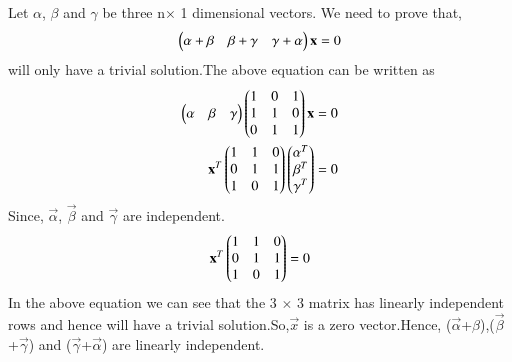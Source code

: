    Let $\alpha$, $\beta$ and $\gamma$ be three n$\times$ 1 dimensional vectors. We need to prove that,
   \begin{align}
   \begin{pmatrix}\alpha+\beta&\beta+\gamma&\gamma+\alpha\end{pmatrix}\mathbf{x}=0
  \end{align}
     will only have a trivial solution.The above equation can be written as
  \begin{align}
  \begin{pmatrix}\alpha&\beta&\gamma\end{pmatrix} \begin{pmatrix}1&0&1\\1&1&0\\0&1&1\end{pmatrix}\mathbf{x}=0\\
   \mathbf{x}^T\begin{pmatrix}1&1&0\\0&1&1\\1&0&1\end{pmatrix}\begin{pmatrix}\alpha^T\\\beta^T\\\gamma^T\end{pmatrix}=0\label{final}
   \end{align}
Since, $\vec{\alpha}$, $\vec{\beta}$ and $\vec{\gamma}$ are independent.
\begin{align}
 \mathbf{x}^T\begin{pmatrix}1&1&0\\0&1&1\\1&0&1\end{pmatrix}=0
\end{align} 
In the above equation we can see that the 3 $\times$ 3 matrix has linearly independent rows and hence will have a trivial solution.So,$\vec{x}$ is a zero vector.Hence, ($\vec{\alpha}$+$\beta$),($\vec{\beta}$+$\vec{\gamma}$) and ($\vec{\gamma}$+$\vec{\alpha}$) are linearly independent.


